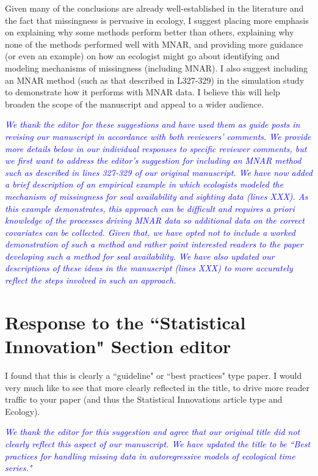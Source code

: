 \documentclass{article}
\begin{document}
\begin{linenumbers}
\bigskip

\noindent Given many of the conclusions are already well-established in the literature and the fact that missingness is pervasive in ecology, I suggest placing more emphasis on explaining why some methods perform better than others, explaining why none of the methods performed well with MNAR, and providing more guidance (or even an example) on how an ecologist might go about identifying and modeling mechanisms of missingness (including MNAR). I also suggest including an MNAR method (such as that described in L327-329) in the simulation study to demonstrate how it performs with MNAR data. I believe this will help broaden the scope of the manuscript and appeal to a wider audience.

\noindent \textcolor{blue}{\textit{We thank the editor for these suggestions and have used them as guide posts in revising our manuscript in accordance with both reviewers' comments. We provide more details below in our individual responses to specific reviewer comments, but we first want to address the editor's suggestion for including an MNAR method such as described in lines 327-329 of our original manuscript. We have now added a brief description of an empirical example in which ecologists modeled the mechanism of missingness for seal availability and sighting data (lines XXX). As this example demonstrates, this approach can be difficult and requires \textit{a priori} knowledge of the processes driving MNAR data so additional data on the correct covariates can be collected. Given that, we have opted not to include a worked demonstration of such a method and rather point interested readers to the paper developing such a method for seal availability. We have also updated our descriptions of these ideas in the manuscript (lines XXX) to more accurately reflect the steps involved in such an approach.}}

\section{Response to the ``Statistical Innovation" Section editor}
I found that this is clearly a ``guideline" or ``best practices" type paper.  I would very much like to see that more clearly reflected in the title, to drive more reader traffic to your paper (and thus the Statistical Innovations article type and Ecology).

\noindent \textcolor{blue}{\textit{We thank the editor for this suggestion and agree that our original title did not clearly reflect this aspect of our manuscript. We have updated the title to be ``Best practices for handling missing data in autoregressive models of ecological time series."}}


\end{linenumbers}
\end{document}
